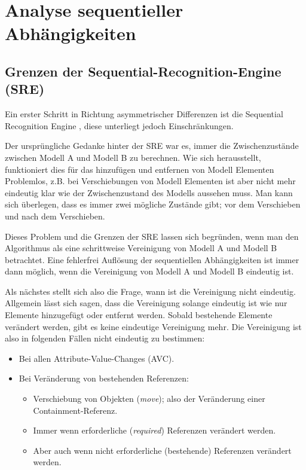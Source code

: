 \section{Analyse sequentieller Abhängigkeiten}

\subsection{Grenzen der Sequential-Recognition-Engine (SRE)}
Ein erster Schritt in Richtung asymmetrischer Differenzen ist 
die Sequential Recognition Engine \cite{Oh2012BA}, diese unterliegt jedoch 
Einschränkungen.

Der ursprüngliche Gedanke hinter der SRE war es, immer die Zwischenzustände zwischen Modell A und
Modell B zu berechnen. Wie sich herausstellt, funktioniert dies für das hinzufügen und entfernen von
Modell Elementen Problemlos, z.B. bei Verschiebungen von Modell Elementen ist aber nicht mehr
eindeutig klar wie der Zwischenzustand des Modells aussehen muss. Man kann sich überlegen, dass es
immer zwei mögliche Zustände gibt; vor dem Verschieben und nach dem Verschieben.

Dieses Problem und die Grenzen der SRE lassen sich begründen, wenn man den Algorithmus als eine
schrittweise Vereinigung von Modell A und Modell B betrachtet. Eine fehlerfrei Auflösung der
sequentiellen Abhängigkeiten ist immer dann möglich, wenn die Vereinigung von Modell A und Modell B
eindeutig ist.

Als nächstes stellt sich also die Frage, wann ist die Vereinigung nicht eindeutig. Allgemein lässt
sich sagen, dass die Vereinigung solange  eindeutig ist wie nur Elemente hinzugefügt oder entfernt
werden. Sobald bestehende Elemente verändert werden, gibt es keine eindeutige Vereinigung mehr. Die
Vereinigung ist also in folgenden Fällen nicht eindeutig zu bestimmen:

\begin{itemize}
  \item Bei allen Attribute-Value-Changes (AVC).
  \item Bei Veränderung von bestehenden Referenzen:
  \begin{itemize}
    \item Verschiebung von Objekten (\textit{move}); also der Veränderung einer
    Containment-Referenz.
    \item Immer wenn erforderliche (\textit{required}) Referenzen verändert werden.
    \item Aber auch wenn nicht erforderliche (bestehende) Referenzen verändert werden.
  \end{itemize}
\end{itemize}

